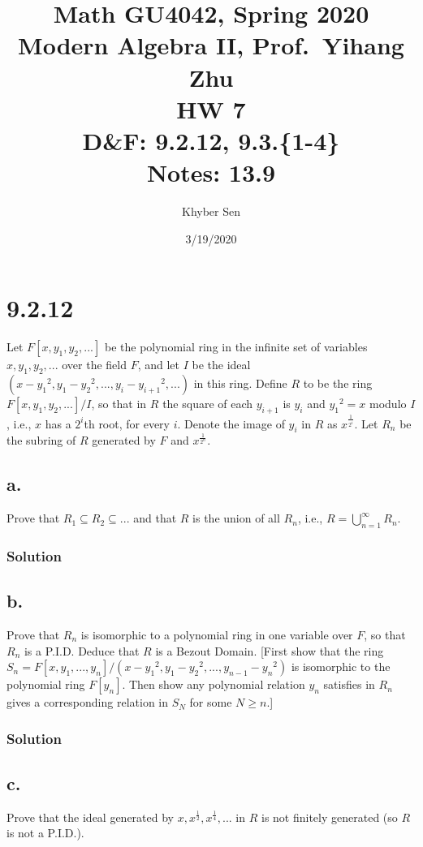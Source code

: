 \documentclass[fleqn]{article}
\title{
Math GU4042, Spring 2020 \\
Modern Algebra II, Prof.\ Yihang Zhu \\
HW 7 \\
D\&F: 9.2.12, 9.3.\{1-4\} \\
Notes: 13.9 \\
}
\author{Khyber Sen}
\date{3/19/2020}
\begin{document}
    
    \maketitle
    
    \section{9.2.12}
    Let $F[x, y_1, y_2, ...]$ be the polynomial ring in the infinite set of variables $x, y_1, y_2, ...$ over the field $F$, and let $I$ be the ideal $\left(x - {y_1}^2, y_1 - {y_2}^2, ..., y_i - {y_{i + 1}}^2, ...\right)$ in this ring.  Define $R$ to be the ring $F[x, y_1, y_2, ...]/I$, so that in $R$ the square of each $y_{i + 1}$ is $y_i$ and ${y_1}^2 = x$ modulo $I$, i.e., $x$ has a $2^i$th root, for every $i$.  Denote the image of $y_i$ in $R$ as $x^{\frac{1}{2^i}}$.  Let $R_n$ be the subring of $R$ generated by $F$ and $x^{\frac{1}{2^n}}$.
        
        \subsection{a.}
        Prove that $R_1 \subseteq R_2 \subseteq ...$ and that $R$ is the union of all $R_n$, i.e., $R = \bigcup\limits_{n = 1}^{\infty} R_n$.
            
            \subsubsection{Solution}
            
        
        \subsection{b.}
        Prove that $R_n$ is isomorphic to a polynomial ring in one variable over $F$, so that $R_n$ is a P.I.D.  Deduce that $R$ is a Bezout Domain.  [First show that the ring $S_n = F[x, y_1, ..., y_n]/\left(x - {y_1}^2, y_1 - {y_2}^2, ..., y_{n - 1} - {y_n}^2\right)$ is isomorphic to the polynomial ring $F[y_n]$.  Then show any polynomial relation $y_n$ satisfies in $R_n$ gives a corresponding relation in $S_N$ for some $N \geq n$.]
            
            \subsubsection{Solution}
            
        
        \subsection{c.}
        Prove that the ideal generated by $x, x^\frac{1}{2}, x^\frac{1}{4}, ...$ in $R$ is not finitely generated (so $R$ is not a P.I.D.).
            
\end{document}
